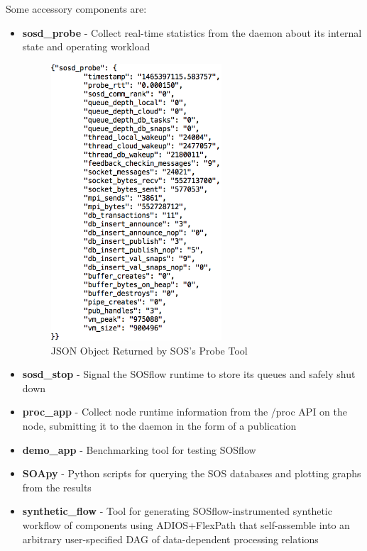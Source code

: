 Some accessory components are:
\begin{itemize}
\item \textbf{sosd\_probe} - Collect real-time statistics from the daemon about
      its internal state and operating workload
      \begin{figure}[!t]
        \centering
        \includegraphics[width=2.5in]{images/probe_json_example.png}
        \caption{JSON Object Returned by SOS's Probe Tool}
        \label{fig_sim}
      \end{figure}

\item \textbf{sosd\_stop} - Signal the SOSflow runtime to store its queues and
      safely shut down
\item \textbf{proc\_app} - Collect node runtime information from the /proc
      API on the node, submitting it to the daemon in the form of a publication
\item \textbf{demo\_app} - Benchmarking tool for testing SOSflow
\item \textbf{SOApy} - Python scripts for querying the SOS databases and plotting
      graphs from the results

\item \textbf{synthetic\_flow} - Tool for generating SOSflow-instrumented
      synthetic workflow of components using ADIOS+FlexPath
      that self-assemble into an arbitrary  user-specified DAG of
      data-dependent processing relations
\end{itemize}


